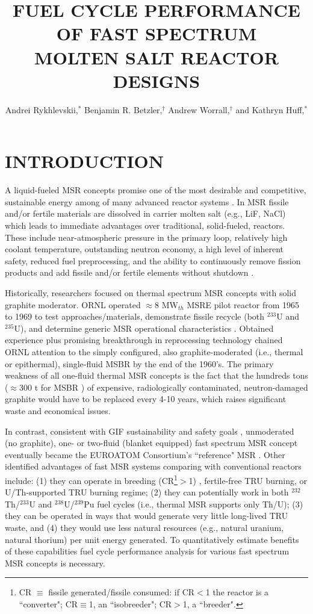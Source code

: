 \documentclass{anstrans}
\title{FUEL CYCLE PERFORMANCE OF FAST SPECTRUM \\
  MOLTEN SALT REACTOR DESIGNS}
\author{Andrei Rykhlevskii,$^{*}$ Benjamin R. Betzler,$^{\dagger}$ Andrew Worrall,$^{\dagger}$ and Kathryn Huff,$^{*}$}
\institute{
$^{*}$Dept. of Nuclear, Plasma, and Radiological Engineering, University of Illinois at 
  Urbana-Champaign, Urbana, IL \\ andreir2@illinois.edu
\and
$^{\dagger}$Oak Ridge National Laboratory, 1 Bethel Valley Road, Oak Ridge, TN, USA
}
\begin{document}
\section{INTRODUCTION} 
\label{sec:intro}
A liquid-fueled \gls{MSR} concepts promise one of the most desirable and competitive, sustainable energy among of many advanced reactor systems \cite{siemer_why_2015}. In \gls{MSR} fissile and/or fertile materials are dissolved in carrier molten salt (e.g., LiF, NaCl) which leads to immediate advantages over traditional, solid-fueled, reactors. These include near-atmospheric pressure in the primary loop, relatively high coolant temperature, outstanding neutron economy, a high level of inherent safety,
reduced fuel preprocessing, and the ability to continuously remove fission products and add fissile and/or fertile elements without shutdown \cite{leblanc_molten_2010}. 

Historically, researchers focused on thermal spectrum \gls{MSR} concepts with solid graphite moderator.  \gls{ORNL} operated $\approx$8 MW$_{th}$ \gls{MSRE} pilot reactor from 1965 to 1969 to test approaches/materials, demonstrate fissile recycle (both $^{233}$U and $^{235}$U), and determine generic \gls{MSR} operational characteristics \cite{macpherson_molten_1985}. Obtained experience plus promising breakthrough in reprocessing technology \cite{whatley_engineering_1970} chained \gls{ORNL} attention to the simply configured, also graphite-moderated (i.e., thermal or epithermal), single-fluid \gls{MSBR} by the end of the 1960's. The primary weakness of all one-fluid thermal \gls{MSR} concepts is the fact that the hundreds tons ($\approx$300 t for \gls{MSBR} \cite{robertson_conceptual_1971}) of expensive, radiologically contaminated, neutron-damaged graphite would have to be replaced every 4-10 years, which raises significant waste and economical issues.

In contrast, consistent with \gls{GIF} sustainability and safety goals \cite{gif_generation_2015}, unmoderated (no graphite), one- or two-fluid (blanket equipped) fast spectrum \gls{MSR} concept eventually became the EUROATOM Consortium's ``reference" \gls{MSR} \cite{noauthor_final_2015}. Other identified advantages of fast \gls{MSR} systems comparing with conventional reactors include: (1) they can operate in breeding (CR\footnote{\gls{CR} $\equiv$ fissile generated/fissile consumed: if CR$<$1 the reactor is a ``converter"; CR$\equiv$1, an ``isobreeder"; CR$>$1, a ``breeder".}$>$1) \cite{noauthor_final_2015,simmons_assessment_1974,mourogov_potentialities_2006}, fertile-free \gls{TRU} burning, or U/Th-supported \gls{TRU} burning \cite{ignatiev_progress_2007} regime; (2) they can potentially work in both $^{232}$Th/$^{233}$U and $^{238}$U/$^{239}$Pu fuel cycles (i.e., thermal \gls{MSR} supports only Th/U); (3) they can be operated in ways that would generate very little long-lived \gls{TRU} waste, and (4) they would use less natural resources (e.g., natural uranium, natural thorium) per unit energy generated. To quantitatively estimate benefits of these capabilities fuel cycle performance analysis for various fast spectrum \gls{MSR} concepts is necessary.
\end{document}
